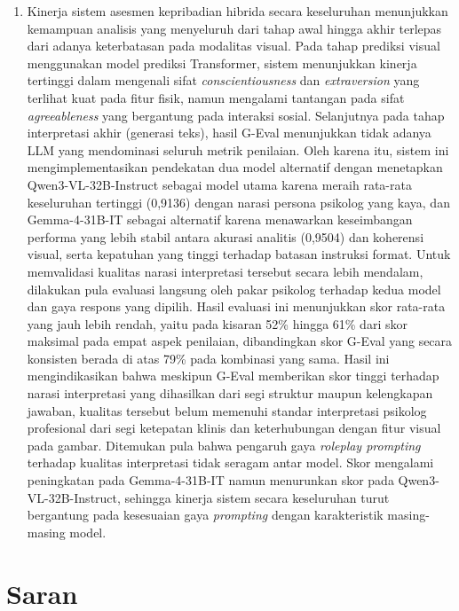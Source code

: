 \begin{enumerate}[nosep]
  \item Kinerja sistem asesmen kepribadian hibrida secara keseluruhan menunjukkan kemampuan analisis yang menyeluruh dari tahap awal hingga akhir terlepas dari adanya keterbatasan pada modalitas visual. Pada tahap prediksi visual menggunakan model prediksi Transformer, sistem menunjukkan kinerja tertinggi dalam mengenali sifat \textit{conscientiousness} dan \textit{extraversion} yang terlihat kuat pada fitur fisik, namun mengalami tantangan pada sifat \textit{agreeableness} yang bergantung pada interaksi sosial. Selanjutnya pada tahap interpretasi akhir (generasi teks), hasil G-Eval menunjukkan tidak adanya LLM yang mendominasi seluruh metrik penilaian. Oleh karena itu, sistem ini mengimplementasikan pendekatan dua model alternatif dengan menetapkan Qwen3-VL-32B-Instruct sebagai model utama karena meraih rata-rata keseluruhan tertinggi (0,9136) dengan narasi persona psikolog yang kaya, dan Gemma-4-31B-IT sebagai alternatif karena menawarkan keseimbangan performa yang lebih stabil antara akurasi analitis (0,9504) dan koherensi visual, serta kepatuhan yang tinggi terhadap batasan instruksi format. Untuk memvalidasi kualitas narasi interpretasi tersebut secara lebih mendalam, dilakukan pula evaluasi langsung oleh pakar psikolog terhadap kedua model dan gaya respons yang dipilih. Hasil evaluasi ini menunjukkan skor rata-rata yang jauh lebih rendah, yaitu pada kisaran 52\% hingga 61\% dari skor maksimal pada empat aspek penilaian, dibandingkan skor G-Eval yang secara konsisten berada di atas 79\% pada kombinasi yang sama. Hasil ini mengindikasikan bahwa meskipun G-Eval memberikan skor tinggi terhadap narasi interpretasi yang dihasilkan dari segi struktur maupun kelengkapan jawaban, kualitas tersebut belum memenuhi standar interpretasi psikolog profesional dari segi ketepatan klinis dan keterhubungan dengan fitur visual pada gambar. Ditemukan pula bahwa pengaruh gaya \textit{roleplay prompting} terhadap kualitas interpretasi tidak seragam antar model. Skor mengalami peningkatan pada Gemma-4-31B-IT namun menurunkan skor pada Qwen3-VL-32B-Instruct, sehingga kinerja sistem secara keseluruhan turut bergantung pada kesesuaian gaya \textit{prompting} dengan karakteristik masing-masing model.

\end{enumerate}

\section{Saran}
\label{chap:saran}

